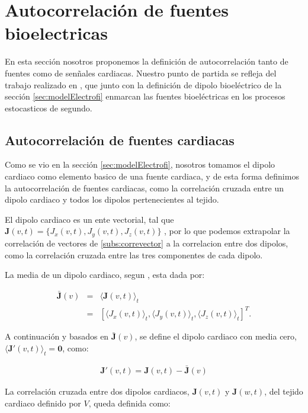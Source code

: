 \section{Autocorrelación de fuentes bioelectricas}

En esta sección nosotros proponemos la definición de autocorrelación tanto de
fuentes como de senñales cardiacas. Nuestro punto de partida se refleja del
trabajo realizado en \cite{Requena08}, que junto con la
definición de dipolo bioeléctrico de la sección \ref{sec:modelElectrofi}
enmarcan las fuentes bioeléctricas en los procesos estocasticos de segundo.


\subsection{Autocorrelación  de fuentes cardiacas}

Como se vio en la sección \ref{sec:modelElectrofi}, nosotros tomamos el dipolo
cardiaco como elemento basico de una fuente cardiaca, y de esta forma definimos
la autocorrelación de fuentes cardiacas, como la correlación cruzada entre un
dipolo cardiaco y todos los dipolos pertenecientes al tejido.

El dipolo cardiaco es un ente  vectorial, tal que $\mathbf{J}(v,t)={\{ J_x(v,t),
J_y(v,t), J_z(v,t) \}}$ \cite{Malmivuo95}, por lo que podemos extrapolar la
correlación de vectores de  \ref{subs:correvector} a la correlacion entre dos
dipolos,  como la correlación cruzada entre las tres componentes de cada dipolo.

La media de un dipolo cardiaco, segun \cite{Papoulis91},  esta dada por:

 \begin{eqnarray}\label{eq:average_dipole}
 \bar{\mathbf{J}}(v)&=&\langle\mathbf{J}(v,t)\rangle_t  \nonumber \\
	&=& [\langle J_x(v,t)\rangle_t, \langle J_y(v,t)\rangle_t, \langle J_z(v,t)\rangle_t]^T.
 \end{eqnarray}

A continuación  y basados en  $\bar{\mathbf{J}}(v)$, se define el dipolo
cardiaco con media cero, $\langle\mathbf{J'}(v,t)\rangle_t=\mathbf{0}$, como:


\begin{eqnarray}\label{eq:zero_average_dipole}
	\mathbf{J'}(v,t)=\mathbf{J}(v,t)-\bar{\mathbf{J}}(v)
\end{eqnarray}

La correlación cruzada entre dos dipolos cardiacos, $\mathbf{J}(v,t)$ y
$\mathbf{J}(w,t)$, del tejido cardiaco definido por $V$, queda definida como:

